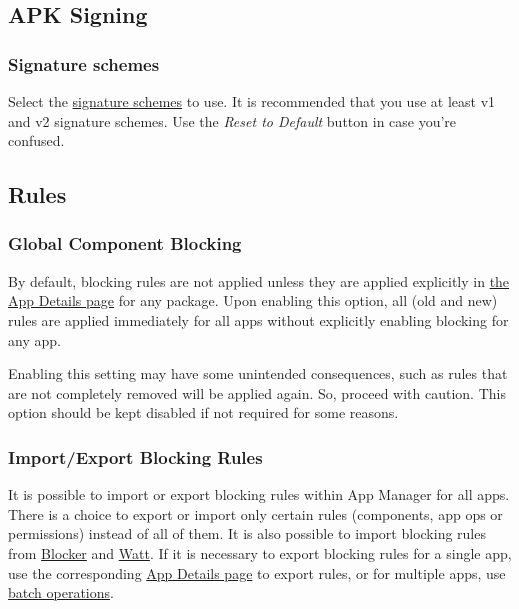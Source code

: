 \subsection{APK Signing}\label{subsec:apk-signing}

\subsubsection{Signature schemes}
Select the \href{https://source.android.com/security/apksigning}{signature schemes} to use. It is recommended that you
use at least v1 and v2 signature schemes. Use the \textit{Reset to Default} button in case you're confused.

\subsection{Rules}\label{subsec:rules}

\subsubsection{Global Component Blocking}\label{subsubsec:instant-component-blocking}
By default, blocking rules are not applied unless they are applied explicitly in \hyperref[sec:app-details-page]{the App
Details page} for any package. Upon enabling this option, all (old and new) rules are applied immediately for all apps
without explicitly enabling blocking for any app.

\begin{warning}[Notice]
    Enabling this setting may have some unintended consequences, such as rules that are not completely removed will be
    applied again. So, proceed with caution. This option should be kept disabled if not required for some reasons.
\end{warning}


\subsubsection{Import/Export Blocking Rules}
It is possible to import or export blocking rules within App Manager for all apps. There is a choice to export or import
only certain rules (components, app ops or permissions) instead of all of them. It is also possible to import blocking
rules from \href{https://github.com/lihenggui/blocker}{Blocker} and \href{https://github.com/tuyafeng/Watt}{Watt}. If it
is necessary to export blocking rules for a single app, use the corresponding \hyperref[sec:app-details-page]{App
Details page} to export rules, or for multiple apps, use \hyperref[subsec:batch-operations]{batch operations}.

